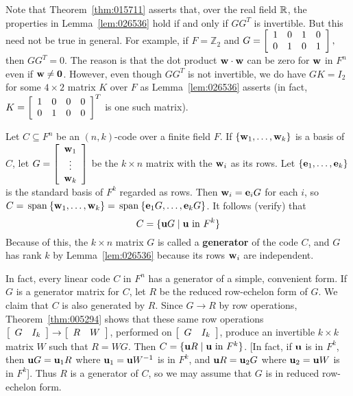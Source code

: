 \noindent Note that Theorem~\ref{thm:015711} asserts that, over the real field $\mathbb{R}$, the properties in Lemma~\ref{lem:026536} hold if and only if $GG^{T}$ is invertible. But this need not be true in general. For example, if $F = \mathbb{Z}_2$ and $G = \left[ \begin{array}{rrrr}
1 & 0 & 1 & 0 \\
0 & 1 & 0 & 1 
\end{array}\right],$ then $GG^{T} = 0$. The reason is that the dot product $\textbf{w} \cdot \textbf{w}$ can be zero for $\textbf{w}$ in $F^{n}$ even if $\textbf{w} \neq \textbf{0}$. However, even though $GG^{T}$ is not invertible, we do have $GK = I_{2}$ for some $4 \times 2$ matrix $K$ over $F$ as Lemma~\ref{lem:026536} asserts (in fact, $K = \left[ \begin{array}{rrrr}
1 & 0 & 0 & 0 \\
0 & 1 & 0 & 0 
\end{array}\right]^T$ is one such matrix).

Let $C \subseteq F^n$ be an $(n, k)$-code over a finite field $F$. If $\{\textbf{w}_{1}, \dots, \textbf{w}_{k}\}$ is a basis of $C$, let $G = \left[ \begin{array}{c}
\textbf{w}_{1}\\
\vdots \\
\textbf{w}_{k}
\end{array}\right]$ be the $k \times n$ matrix with the $\textbf{w}_{i}$ as its rows. Let $\{\textbf{e}_{1}, \dots, \textbf{e}_{k}\}$ is the standard basis of $F^{k}$ regarded as rows. Then $\textbf{w}_{i} = \textbf{e}_{i}G$ for each $i$, so $C = \thinspace\operatorname{span\medspace}\{\textbf{w}_{1}, \dots, \textbf{w}_{k}\} = \thinspace\operatorname{span\medspace}\{\textbf{e}_{1}G, \dots, \textbf{e}_{k}G\}$. It follows (verify) that
\begin{equation*}
C =  \{\textbf{u}G \mid \textbf{u} \mbox{ in } F^k \}
\end{equation*}
Because of this, the $k \times n$ matrix $G$ is called a \textbf{generator} of the code $C$, and $G$ has rank $k$ by Lemma~\ref{lem:026536} because its rows $\textbf{w}_{i}$ are independent.

In fact, every linear code $C$ in $F^{n}$ has a generator of a simple, convenient form. If $G$ is a generator matrix for $C$, let $R$ be the reduced row-echelon form of $G$. We claim that $C$ is also generated by $R$. Since $G \to R$ by row operations, Theorem~\ref{thm:005294} shows that these same row operations $\left[ \begin{array}{cc}
G & I_k
\end{array} \right] \to 
\left[ \begin{array}{cc}
R & W
\end{array} \right]$, performed on 
$\left[ \begin{array}{cc}
G & I_k
\end{array} \right]$, produce an invertible $k \times k$ matrix $W$ such that $R = WG$. Then $C = \{\textbf{u}R \mid \textbf{u} \mbox{ in } F^{k}\}$. [In fact, if $\textbf{u}$ is in $F^{k}$, then $\textbf{u}G = \textbf{u}_{1}R$ where $\textbf{u}_{1} = \textbf{u}W^{-1}$ is in $F^{k}$, and $\textbf{u}R = \textbf{u}_{2}G$ where $\textbf{u}_{2} = \textbf{u}W$ is in $F^{k}$]. Thus $R$ is a generator of $C$, so we may assume that $G$ is in reduced row-echelon form.

